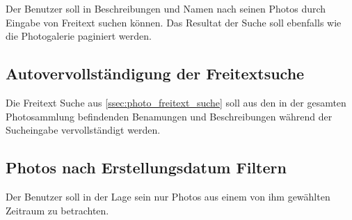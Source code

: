 Der Benutzer soll in Beschreibungen und Namen nach seinen Photos durch Eingabe von Freitext suchen können. Das Resultat der Suche soll ebenfalls wie die Photogalerie paginiert werden.

\subsection{Autovervollständigung der Freitextsuche}

Die Freitext Suche aus \ref{ssec:photo_freitext_suche} soll aus den in der gesamten Photosammlung befindenden Benamungen und Beschreibungen während der 
Sucheingabe vervollständigt werden.

\subsection{Photos nach Erstellungsdatum Filtern}

Der Benutzer soll in der Lage sein nur Photos aus einem von ihm gewählten Zeitraum zu betrachten. 



